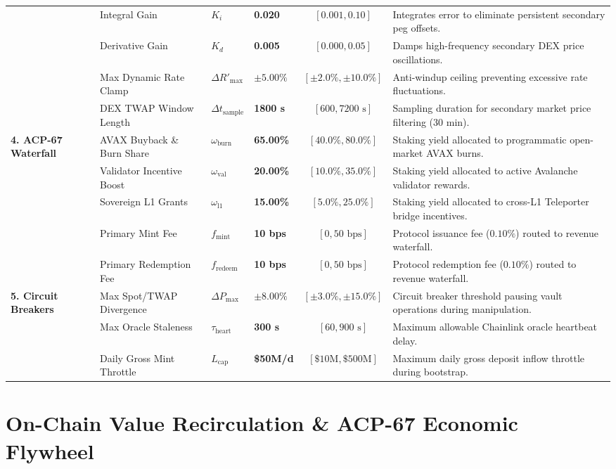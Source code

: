 \documentclass[11pt,a4paper]{article}
\begin{document}
\begin{table}[H]
{\begin{tabular}{@{}llllcl@{}}
& Integral Gain & $K_i$ & \textbf{0.020} & $[0.001, 0.10]$ & Integrates error to eliminate persistent secondary peg offsets. \\
& Derivative Gain & $K_d$ & \textbf{0.005} & $[0.000, 0.05]$ & Damps high-frequency secondary DEX price oscillations. \\
& Max Dynamic Rate Clamp & $\Delta R'_{\max}$ & \textbf{$\pm 5.00\%$} & $[\pm 2.0\%, \pm 10.0\%]$ & Anti-windup ceiling preventing excessive rate fluctuations. \\
& DEX TWAP Window Length & $\Delta t_{\text{sample}}$ & \textbf{1800 s} & $[600, 7200\text{ s}]$ & Sampling duration for secondary market price filtering (30 min). \\ \midrule
\textbf{4. ACP-67 Waterfall}& AVAX Buyback \& Burn Share & $\omega_{\text{burn}}$ & \textbf{65.00\%} & $[40.0\%, 80.0\%]$ & Staking yield allocated to programmatic open-market AVAX burns. \\
& Validator Incentive Boost & $\omega_{\text{val}}$ & \textbf{20.00\%} & $[10.0\%, 35.0\%]$ & Staking yield allocated to active Avalanche validator rewards. \\
& Sovereign L1 Grants & $\omega_{\text{l1}}$ & \textbf{15.00\%} & $[5.0\%, 25.0\%]$ & Staking yield allocated to cross-L1 Teleporter bridge incentives. \\
& Primary Mint Fee & $f_{\text{mint}}$ & \textbf{10 bps} & $[0, 50\text{ bps}]$ & Protocol issuance fee ($0.10\%$) routed to revenue waterfall. \\
& Primary Redemption Fee & $f_{\text{redeem}}$ & \textbf{10 bps} & $[0, 50\text{ bps}]$ & Protocol redemption fee ($0.10\%$) routed to revenue waterfall. \\ \midrule
\textbf{5. Circuit Breakers}& Max Spot/TWAP Divergence & $\Delta P_{\max}$ & \textbf{$\pm 8.00\%$} & $[\pm 3.0\%, \pm 15.0\%]$ & Circuit breaker threshold pausing vault operations during manipulation. \\
& Max Oracle Staleness & $\tau_{\text{heart}}$ & \textbf{300 s} & $[60, 900\text{ s}]$ & Maximum allowable Chainlink oracle heartbeat delay. \\
& Daily Gross Mint Throttle & $L_{\text{cap}}$ & \textbf{\$50M/d} & $[\$10\text{M}, \$500\text{M}]$ & Maximum daily gross deposit inflow throttle during bootstrap. \\ \bottomrule
\end{tabular}%
}
\end{table}

\section{On-Chain Value Recirculation \& ACP-67 Economic Flywheel}
\end{document}
